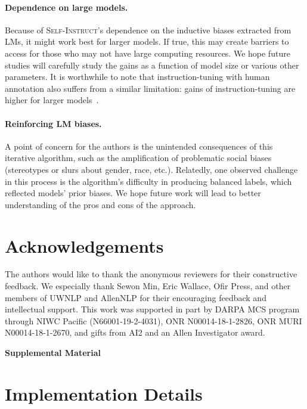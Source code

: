 \documentclass[11pt]{article}
\newcommand{\name}{\textsc{Self-Instruct}}
\begin{document}
\paragraph{Dependence on large models.} 
Because of \name's dependence on the inductive biases extracted from LMs, it might work best for larger models. 
If true, this may create barriers to access for those who may not have large computing resources. 
We hope future studies will carefully study the gains as a function of model size or various other parameters. 
It is worthwhile to note that instruction-tuning with human annotation also suffers from a similar limitation: gains of instruction-tuning are higher for larger models~\cite{wei2022finetuned}. 

\paragraph{Reinforcing LM biases.}
A point of concern for the authors is the unintended consequences of this iterative algorithm, such as the amplification of problematic social biases (stereotypes or slurs about gender, race, etc.). 
Relatedly, one observed challenge in this process is the algorithm's difficulty in producing balanced labels, which reflected models' prior biases. 
We hope future work will lead to better understanding of the pros and cons of the approach. 


\section*{Acknowledgements}
The authors would like to thank the anonymous reviewers for their constructive feedback. We especially thank Sewon Min, Eric Wallace, Ofir Press, and other members of UWNLP and AllenNLP for their encouraging feedback and intellectual support. 
This work was supported in part by
DARPA MCS program through NIWC Pacific (N66001-19-2-4031),
ONR N00014-18-1-2826, ONR MURI N00014-18-1-2670,
and gifts from AI2 and an Allen Investigator award.




\clearpage
\appendix
\onecolumn
\begin{center}
{\Large \textbf{Supplemental Material}}
\end{center}

\section{Implementation Details}
\label{sec:implementaion}
\end{document}

